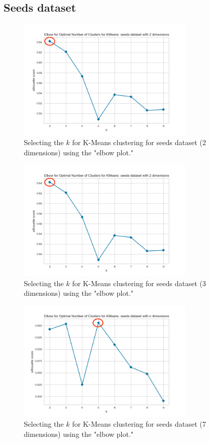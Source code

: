 \subsection{Seeds dataset}
\begin{figure}[H]
  \includegraphics[width=0.75\textwidth]{Method/images//k-values/seeds-dataset-2-kmeans.png}
  \caption{Selecting the $k$ for K-Means clustering for seeds dataset (2 dimensions) using the "elbow plot."}
  \label{hyperparameters:agglomerative-seeds-dataset-2d}
\end{figure}
\begin{figure}[H]
  \includegraphics[width=0.75\textwidth]{Method/images/k-values/seeds-dataset-2-kmeans.png}
  \caption{Selecting the $k$ for K-Means clustering for seeds dataset (3 dimensions) using the "elbow plot."}
  \label{hyperparameters:agglomerative-seeds-dataset-3d}
\end{figure}
\begin{figure}[H]
  \includegraphics[width=0.75\textwidth]{Method/images/k-values/seeds-dataset-n-kmeans.png}
  \caption{Selecting the $k$ for K-Means clustering for seeds dataset (7 dimensions) using the "elbow plot."}
  \label{hyperparameters:agglomerative-seeds-dataset-7d}
\end{figure}
\newpage

